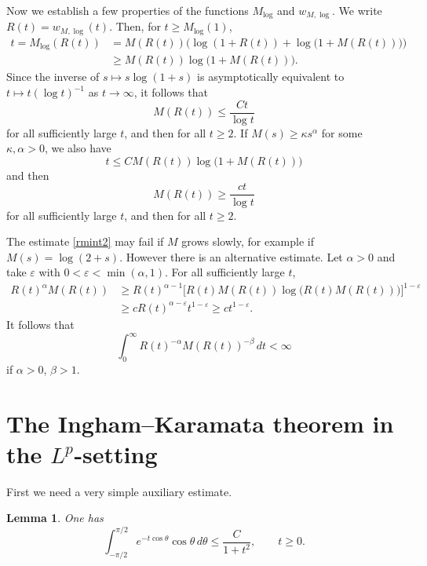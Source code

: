 \documentclass[11pt]{amsart}
\newtheorem{lemma}[theorem]{Lemma}
\theoremstyle{definition}
\theoremstyle{remark}
\numberwithin{equation}{section}
\begin{document}
Now we establish a few properties of the functions $M_{\log}$ and ${w_{M,{\log}}}$.  We write $R(t) = {w_{M,{\log}}}(t)$. Then, for $t\ge M_{\log}(1)$,
\begin{align*}
t = M_{\log} (R(t)) &= M(R(t)) \Big(\log(1+R(t)) + \log \big(1 + M(R(t))\big) \Big) \\
&\ge M(R(t)) \log \big( 1 + M(R(t))\big) .
\end{align*}
Since the inverse of $s \mapsto s \log(1+s)$ is asymptotically equivalent to $t \mapsto t(\log t)^{-1}$ as $t\to\infty$, it follows that
\begin{equation} \label{rmint}
 M(R(t)) \le \frac{C t}{\log t}
\end{equation}
for all sufficiently large $t$, and then for all $t\ge2$.  If $M(s) \ge \kappa s^\alpha$ for some $\kappa,\alpha>0$, we also have
$$
t  \le C M(R(t)) \log \big( 1 + M(R(t))\big)
$$
and then
\begin{equation} \label{rmint2}
 M(R(t)) \ge \frac{c t}{\log t}
\end{equation}
for all sufficiently large $t$, and then for all $t\ge2$.

The estimate \eqref{rmint2} may fail if $M$ grows slowly, for example if $M(s) = \log(2+s)$.  However there is an alternative estimate.  Let $\alpha>0$ and take ${{\varepsilon}}$ with $0 < {{\varepsilon}} < \min(\alpha,1)$.  For all sufficiently large $t$,
\begin{align*} \label{rmint3}
R(t)^\alpha M(R(t)) &\ge  R(t)^{\alpha-1} \big[R(t) M(R(t)) \log\big(R(t)M(R(t))\big)\big]^{1-{{\varepsilon}}} \\
&\ge c R(t)^{\alpha-{{\varepsilon}}} t^{1-{{\varepsilon}}} \ge ct^{1-{{\varepsilon}}}. \nonumber
\end{align*}
It follows that
\begin{equation} \label{rmint4}
\int_0^\infty R(t)^{-\alpha} M(R(t))^{-\beta}\, dt < \infty
\end{equation}
if $\alpha>0$, $\beta>1$.

\section{The Ingham--Karamata theorem in the $L^p$-setting}\label{se3}

First we need a very simple auxiliary estimate.
\begin{lemma}\label{auxil}
One has
\begin{equation}\label{exponent}
\int_{-\pi/2}^{\pi/2}e^{-t\cos\theta}\cos\theta\, d\theta \le \frac{C}{1+t^2}, \qquad t \ge 0.
\end{equation}
\end{lemma}
\end{document}
